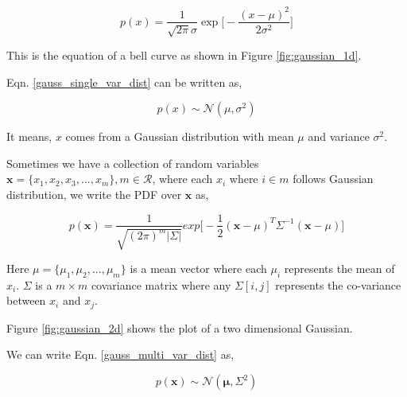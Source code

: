 \documentclass[english]{tktltiki}
\begin{document}
\begin{equation}
p(x) = \frac{1}{\sqrt{2 \pi}\sigma} \exp \Big[-\frac{(x - \mu)^2}{2 \sigma^2}\Big]
\label{gauss_single_var_dist}
\end{equation}



This is the equation of a bell curve as shown in Figure \ref{fig:gaussian_1d}.

Eqn. \ref{gauss_single_var_dist} can be written as,

\begin{equation}
p(x) \sim \mathcal{N}(\mu, \sigma^2)
\label{gauss_single_var_sym}
\end{equation}

It means, $x$ comes from a Gaussian distribution with mean $\mu$ and variance $\sigma^2$.

Sometimes we have a collection of random variables $\mathbf{x} = \{x_1, x_2, x_3, ..., x_m\}, m \in \mathcal{R}$, where each $x_i$ where $i \in m$ follows Gaussian distribution, we write the PDF over $\mathbf{x}$ as,

\begin{equation}
p(\mathbf{x}) = \frac{1}{\sqrt{(2 \pi)^m |\Sigma|}}exp \Big[-\frac{1}{2}(\mathbf{x} - \mu)^T \Sigma^{-1} (\mathbf{x} - \mu) \Big]
\label{gauss_multi_var_dist}
\end{equation}

Here $\mu = \{\mu_1, \mu_2, ..., \mu_m\}$ is a mean vector where each $\mu_i$ represents the mean of $x_i$. $\Sigma$ is a $m \times m$ covariance matrix where any $\Sigma[i, j]$ represents the co-variance between $x_i$ and $x_j$.

Figure \ref{fig:gaussian_2d} shows the plot of a two dimensional Gaussian.

We can write Eqn. \ref{gauss_multi_var_dist} as,

\begin{equation}
p(\mathbf{x}) \sim \mathcal{N}(\mathbf{\mu}, \Sigma^2)
\label{gauss_multi_var_sym}
\end{equation}
\end{document}
